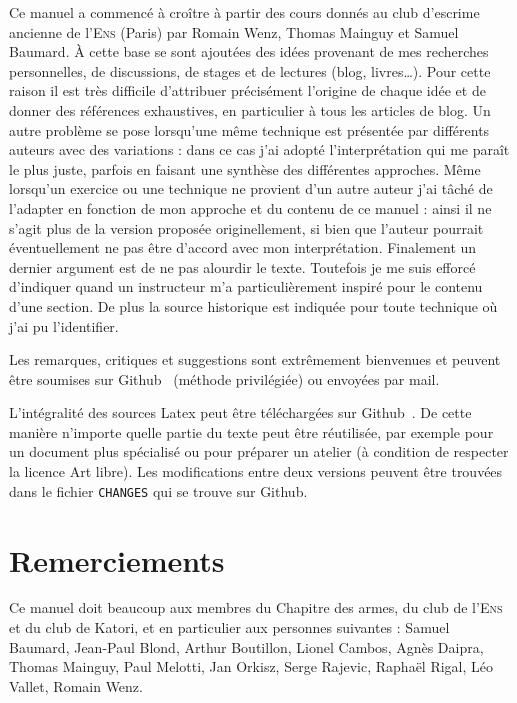 Ce manuel a commencé à croître à partir des cours donnés au club d'escrime ancienne de l'\textsc{Ens} (Paris) par Romain Wenz, Thomas Mainguy et Samuel Baumard.
À cette base se sont ajoutées des idées provenant de mes recherches personnelles, de discussions, de stages et de lectures (blog, livres…).
Pour cette raison il est très difficile d'attribuer précisément l'origine de chaque idée et de donner des références exhaustives, en particulier à tous les articles de blog.
Un autre problème se pose lorsqu'une même technique est présentée par différents auteurs avec des variations : dans ce cas j'ai adopté l'interprétation qui me paraît le plus juste, parfois en faisant une synthèse des différentes approches.
Même lorsqu'un exercice ou une technique ne provient d'un autre auteur j'ai tâché de l'adapter en fonction de mon approche et du contenu de ce manuel : ainsi il ne s'agit plus de la version proposée originellement, si bien que l'auteur pourrait éventuellement ne pas être d'accord avec mon interprétation.
Finalement un dernier argument est de ne pas alourdir le texte.
Toutefois je me suis efforcé d'indiquer quand un instructeur m'a particulièrement inspiré pour le contenu d'une section.
De plus la source historique est indiquée pour toute technique où j'ai pu l'identifier.

Les remarques, critiques et suggestions sont extrêmement bienvenues et peuvent être soumises sur Github~\footnotemark{} (méthode privilégiée) ou envoyées par mail.

L'intégralité des sources Latex peut être téléchargées sur Github~\footnotemark{}.
De cette manière n'importe quelle partie du texte peut être réutilisée, par exemple pour un document plus spécialisé ou pour préparer un atelier (à condition de respecter la licence Art libre).
Les modifications entre deux versions peuvent être trouvées dans le fichier \texttt{CHANGES} qui se trouve sur Github.


\section{Remerciements}


Ce manuel doit beaucoup aux membres du Chapitre des armes, du club de l'\textsc{Ens} et du club de Katori, et en particulier aux personnes suivantes : Samuel Baumard, Jean-Paul Blond, Arthur Boutillon, Lionel Cambos, Agnès Daipra, Thomas Mainguy, Paul Melotti, Jan Orkisz, Serge Rajevic, Raphaël Rigal, Léo Vallet, Romain Wenz.

